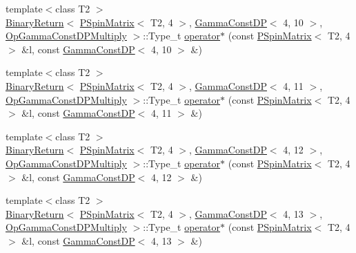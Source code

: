 \begin{DoxyCompactItemize}
\item 
{\footnotesize template$<$class T2 $>$ }\\\mbox{\hyperlink{structENSEM_1_1BinaryReturn}{Binary\+Return}}$<$ \mbox{\hyperlink{classENSEM_1_1PSpinMatrix}{P\+Spin\+Matrix}}$<$ T2, 4 $>$, \mbox{\hyperlink{classENSEM_1_1GammaConstDP}{Gamma\+Const\+DP}}$<$ 4, 10 $>$, \mbox{\hyperlink{structENSEM_1_1OpGammaConstDPMultiply}{Op\+Gamma\+Const\+D\+P\+Multiply}} $>$\+::Type\+\_\+t \mbox{\hyperlink{group__primspinmatrix_gae0a36eebbac7cf857f48a6bd7966e139}{operator$\ast$}} (const \mbox{\hyperlink{classENSEM_1_1PSpinMatrix}{P\+Spin\+Matrix}}$<$ T2, 4 $>$ \&l, const \mbox{\hyperlink{classENSEM_1_1GammaConstDP}{Gamma\+Const\+DP}}$<$ 4, 10 $>$ \&)
\item 
{\footnotesize template$<$class T2 $>$ }\\\mbox{\hyperlink{structENSEM_1_1BinaryReturn}{Binary\+Return}}$<$ \mbox{\hyperlink{classENSEM_1_1PSpinMatrix}{P\+Spin\+Matrix}}$<$ T2, 4 $>$, \mbox{\hyperlink{classENSEM_1_1GammaConstDP}{Gamma\+Const\+DP}}$<$ 4, 11 $>$, \mbox{\hyperlink{structENSEM_1_1OpGammaConstDPMultiply}{Op\+Gamma\+Const\+D\+P\+Multiply}} $>$\+::Type\+\_\+t \mbox{\hyperlink{group__primspinmatrix_gafdfa5cea94c5b8301c476e73bf94071c}{operator$\ast$}} (const \mbox{\hyperlink{classENSEM_1_1PSpinMatrix}{P\+Spin\+Matrix}}$<$ T2, 4 $>$ \&l, const \mbox{\hyperlink{classENSEM_1_1GammaConstDP}{Gamma\+Const\+DP}}$<$ 4, 11 $>$ \&)
\item 
{\footnotesize template$<$class T2 $>$ }\\\mbox{\hyperlink{structENSEM_1_1BinaryReturn}{Binary\+Return}}$<$ \mbox{\hyperlink{classENSEM_1_1PSpinMatrix}{P\+Spin\+Matrix}}$<$ T2, 4 $>$, \mbox{\hyperlink{classENSEM_1_1GammaConstDP}{Gamma\+Const\+DP}}$<$ 4, 12 $>$, \mbox{\hyperlink{structENSEM_1_1OpGammaConstDPMultiply}{Op\+Gamma\+Const\+D\+P\+Multiply}} $>$\+::Type\+\_\+t \mbox{\hyperlink{group__primspinmatrix_ga554a403dc2f232b906a5f7a9971eced3}{operator$\ast$}} (const \mbox{\hyperlink{classENSEM_1_1PSpinMatrix}{P\+Spin\+Matrix}}$<$ T2, 4 $>$ \&l, const \mbox{\hyperlink{classENSEM_1_1GammaConstDP}{Gamma\+Const\+DP}}$<$ 4, 12 $>$ \&)
\item 
{\footnotesize template$<$class T2 $>$ }\\\mbox{\hyperlink{structENSEM_1_1BinaryReturn}{Binary\+Return}}$<$ \mbox{\hyperlink{classENSEM_1_1PSpinMatrix}{P\+Spin\+Matrix}}$<$ T2, 4 $>$, \mbox{\hyperlink{classENSEM_1_1GammaConstDP}{Gamma\+Const\+DP}}$<$ 4, 13 $>$, \mbox{\hyperlink{structENSEM_1_1OpGammaConstDPMultiply}{Op\+Gamma\+Const\+D\+P\+Multiply}} $>$\+::Type\+\_\+t \mbox{\hyperlink{group__primspinmatrix_ga1b7bc726f48b4c37350818e1d825d16d}{operator$\ast$}} (const \mbox{\hyperlink{classENSEM_1_1PSpinMatrix}{P\+Spin\+Matrix}}$<$ T2, 4 $>$ \&l, const \mbox{\hyperlink{classENSEM_1_1GammaConstDP}{Gamma\+Const\+DP}}$<$ 4, 13 $>$ \&)

\end{DoxyCompactItemize}
